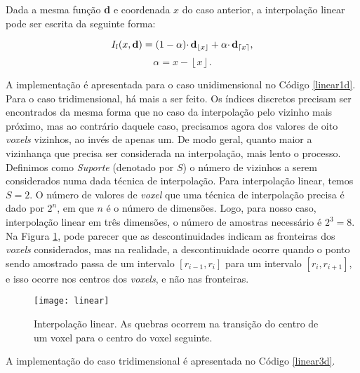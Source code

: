 Dada a mesma função {\bf d} e coordenada $x$ do caso anterior, a interpolação linear pode ser escrita da seguinte forma:
\begin{center}
\[I_{l}(x, {\bf d}) = (1 - \alpha) \cdotp {\bf d}_{\left\lfloor x \right\rfloor} + \alpha \cdotp {\bf d}_{\left\lceil x \right\rceil}, \]
\[
\alpha = x - \left\lfloor x \right\rfloor.\]
\end{center}

A implementação é apresentada para o caso unidimensional no Código \ref{linear1d}. Para o caso tridimensional, há mais a ser feito. Os índices discretos precisam ser encontrados da mesma forma que no caso da interpolação pelo vizinho mais próximo, mas ao contrário daquele caso, precisamos agora dos valores de oito \emph{voxels} vizinhos, ao invés de apenas um. De modo geral, quanto maior a vizinhança que precisa ser considerada na interpolação, mais lento o processo. Definimos como \emph{Suporte} (denotado por $S$) o número de vizinhos a serem considerados numa dada técnica de interpolação. Para interpolação linear, temos $S = 2$. O número de valores de \emph{voxel} que uma técnica de interpolação precisa é dado por $2^{n}$, em que $n$ é o número de dimensões. Logo, para nosso caso, interpolação linear em três dimensões, o número de amostras necessário é $2^{3} = 8$. Na Figura \ref{linearInterp}, pode parecer que as descontinuidades indicam as fronteiras dos \emph{voxels} considerados, mas na realidade, a descontinuidade ocorre quando o ponto sendo amostrado passa de um intervalo $[r_{i-1}, r_{i}]$ para um intervalo $[r_{i}, r_{i+1}]$, e isso ocorre nos centros dos \emph{voxels}, e não nas fronteiras.

\begin{figure}[!htb]

\end{figure}

\begin{figure}[!htb]
\center
\texttt{[image: linear]}
\caption{Interpolação linear. As quebras ocorrem na transição do centro de um voxel para o centro do voxel seguinte.}
\label{linearInterp}
\end{figure}

A implementação do caso tridimensional é apresentada no Código \ref{linear3d}. \\

\begin{figure}[!htb]

\end{figure}

